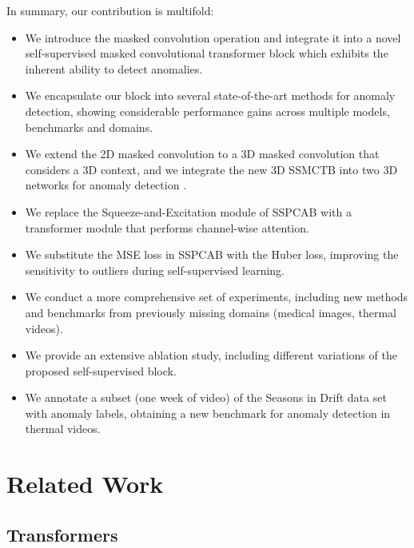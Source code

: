 \documentclass[10pt,journal,compsoc]{IEEEtran}
\begin{document}
In summary, our contribution is multifold:
\begin{itemize}
    \item We introduce the masked convolution operation and integrate it into a novel self-supervised masked convolutional transformer block which exhibits the inherent ability to detect anomalies.
    \item We encapsulate our block into several state-of-the-art methods \cite{Barbalau-ARXIV-2022, Zavrtanik-ICCV-2021, Schulter-ECCV-2022, Georgescu-TPAMI-2021, Liu-ICCV-2021, Park-CVPR-2020, Liu-CVPR-2018, He-CVPR-2022,Vasu-ICCV-2023,Wang-ICDM-2022} for anomaly detection, showing considerable performance gains across multiple models, benchmarks and domains.
    \item We extend the 2D masked convolution to a 3D masked convolution that considers a 3D context, and we integrate the new 3D SSMCTB into two 3D networks for anomaly detection \cite{Barbalau-ARXIV-2022, Zavrtanik-ICCV-2021}.
    \item We replace the Squeeze-and-Excitation module \cite{Hu-CVPR-2018} of SSPCAB with a transformer module that performs channel-wise attention.
    \item We substitute the MSE loss in SSPCAB with the Huber loss, improving the sensitivity to outliers during self-supervised learning.
    \item We conduct a more comprehensive set of experiments, including new methods and benchmarks from previously missing domains (medical images, thermal videos).
    \item We provide an extensive ablation study, including different variations of the proposed self-supervised block.
    \item We annotate a subset (one week of video) of the Seasons in Drift \cite{Nikolov-NIPS-2021} data set with anomaly labels, obtaining a new benchmark for anomaly detection in thermal videos.
\end{itemize}



\section{Related Work}

\subsection{Transformers}
\end{document}
